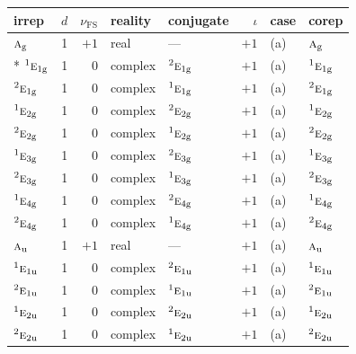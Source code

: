 \documentclass[10pt,a4paper]{article}
\numberwithin{equation}{section}
\newcommand{\irr}[1]{\text{\normalfont\scshape #1}}
\newcommand{\conjpair}[1]{{}^{#1}}
\newcommand{\ptag}[1]{\mathrm{#1}}
\newcommand{\fsind}{\nu_{\mathrm{FS}}}
\begin{document}
{\small\renewcommand{\arraystretch}{1.25}\setlength{\tabcolsep}{4pt}\begin{longtable}{@{}lrrllrll@{}}\toprule
irrep & $d$ & $\fsind$ & reality & conjugate & $\iota$ & case & corep\\\midrule\endhead
\bottomrule\endfoot\endlastfoot
$\irr{a}_{\ptag{g}}$ & 1 & $+1$ & real & --- & $+1$ & (a) & $\irr{a}_{\ptag{g}}$\\*
$\conjpair{1}\irr{e}_{1\ptag{g}}$ & 1 & $0$ & complex & $\conjpair{2}\irr{e}_{1\ptag{g}}$ & $+1$ & (a) & $\conjpair{1}\irr{e}_{1\ptag{g}}$\\
$\conjpair{2}\irr{e}_{1\ptag{g}}$ & 1 & $0$ & complex & $\conjpair{1}\irr{e}_{1\ptag{g}}$ & $+1$ & (a) & $\conjpair{2}\irr{e}_{1\ptag{g}}$\\
$\conjpair{1}\irr{e}_{2\ptag{g}}$ & 1 & $0$ & complex & $\conjpair{2}\irr{e}_{2\ptag{g}}$ & $+1$ & (a) & $\conjpair{1}\irr{e}_{2\ptag{g}}$\\
$\conjpair{2}\irr{e}_{2\ptag{g}}$ & 1 & $0$ & complex & $\conjpair{1}\irr{e}_{2\ptag{g}}$ & $+1$ & (a) & $\conjpair{2}\irr{e}_{2\ptag{g}}$\\
$\conjpair{1}\irr{e}_{3\ptag{g}}$ & 1 & $0$ & complex & $\conjpair{2}\irr{e}_{3\ptag{g}}$ & $+1$ & (a) & $\conjpair{1}\irr{e}_{3\ptag{g}}$\\
$\conjpair{2}\irr{e}_{3\ptag{g}}$ & 1 & $0$ & complex & $\conjpair{1}\irr{e}_{3\ptag{g}}$ & $+1$ & (a) & $\conjpair{2}\irr{e}_{3\ptag{g}}$\\
$\conjpair{1}\irr{e}_{4\ptag{g}}$ & 1 & $0$ & complex & $\conjpair{2}\irr{e}_{4\ptag{g}}$ & $+1$ & (a) & $\conjpair{1}\irr{e}_{4\ptag{g}}$\\
$\conjpair{2}\irr{e}_{4\ptag{g}}$ & 1 & $0$ & complex & $\conjpair{1}\irr{e}_{4\ptag{g}}$ & $+1$ & (a) & $\conjpair{2}\irr{e}_{4\ptag{g}}$\\
$\irr{a}_{\ptag{u}}$ & 1 & $+1$ & real & --- & $+1$ & (a) & $\irr{a}_{\ptag{u}}$\\
$\conjpair{1}\irr{e}_{1\ptag{u}}$ & 1 & $0$ & complex & $\conjpair{2}\irr{e}_{1\ptag{u}}$ & $+1$ & (a) & $\conjpair{1}\irr{e}_{1\ptag{u}}$\\
$\conjpair{2}\irr{e}_{1\ptag{u}}$ & 1 & $0$ & complex & $\conjpair{1}\irr{e}_{1\ptag{u}}$ & $+1$ & (a) & $\conjpair{2}\irr{e}_{1\ptag{u}}$\\
$\conjpair{1}\irr{e}_{2\ptag{u}}$ & 1 & $0$ & complex & $\conjpair{2}\irr{e}_{2\ptag{u}}$ & $+1$ & (a) & $\conjpair{1}\irr{e}_{2\ptag{u}}$\\
$\conjpair{2}\irr{e}_{2\ptag{u}}$ & 1 & $0$ & complex & $\conjpair{1}\irr{e}_{2\ptag{u}}$ & $+1$ & (a) & $\conjpair{2}\irr{e}_{2\ptag{u}}$\\

\end{longtable}}
\end{document}
